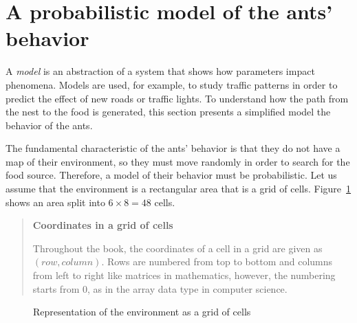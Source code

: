 \section{A probabilistic model of the ants' behavior}\label{s.ant-probabilistic}

A \emph{model} is an abstraction of a system that shows how parameters impact phenomena. Models are used, for example, to study traffic patterns in order to predict the effect of new roads or traffic lights. To understand how the path from the nest to the food is generated, this section presents a simplified model the behavior of the ants. 

The fundamental characteristic of the ants' behavior is that they do not have a map of their environment, so they must move randomly in order to search for the food source. Therefore, a model of their behavior must be probabilistic. Let us assume that the environment is a rectangular area that is a grid of cells. Figure~\ref{fig.ant-grid-empty} shows an area split into $6\times 8=48$ cells.

\begin{quote}
\begin{center}
\textbf{Coordinates in a grid of cells}
\end{center}
Throughout the book, the coordinates of a cell in a grid are given as $(\textit{row}, \textit{column})$. Rows are numbered from top to bottom and columns from left to right like matrices in mathematics, however, the numbering starts from $0$, as in the array data type in computer science.
\end{quote}

\begin{figure}
\begin{center}
\end{center}
\caption{Representation of the environment as a grid of cells}\label{fig.ant-grid-empty}
\end{figure}

